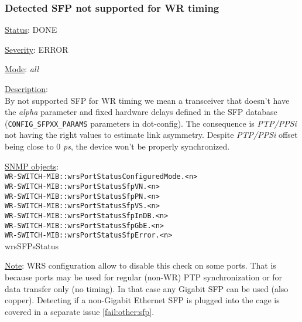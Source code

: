 \subsubsection{\bf Detected SFP not supported for WR timing}
		\label{fail:timing:wrong_sfp}
		\begin{packed_enum}
			\item [] \underline{Status}: DONE
			\item [] \underline{Severity}: ERROR
			\item [] \underline{Mode}: \emph{all}
			\item [] \underline{Description}:\\
				By not supported SFP for WR timing we mean a transceiver that doesn't
				have the \emph{alpha} parameter and fixed hardware delays defined in the
				SFP database (\texttt{CONFIG\_SFPXX\_PARAMS} parameters in dot-config). The consequence is
				\emph{PTP/PPSi} not having the right values to estimate link asymmetry.
				Despite \emph{PTP/PPSi} offset being close to 0 \emph{ps}, the device won't
				be properly synchronized.
			\item [] \underline{SNMP objects}:\\
				\texttt{WR-SWITCH-MIB::wrsPortStatusConfiguredMode.<n>}\\
				\texttt{WR-SWITCH-MIB::wrsPortStatusSfpVN.<n>}\\
				\texttt{WR-SWITCH-MIB::wrsPortStatusSfpPN.<n>}\\
				\texttt{WR-SWITCH-MIB::wrsPortStatusSfpVS.<n>}\\
				\texttt{WR-SWITCH-MIB::wrsPortStatusSfpInDB.<n>}\\
				\texttt{WR-SWITCH-MIB::wrsPortStatusSfpGbE.<n>}\\
				\texttt{WR-SWITCH-MIB::wrsPortStatusSfpError.<n>}\\
				wrsSFPsStatus
			\item [] \underline{Note}: WRS configuration allow to disable this check on some ports.
				That is because ports may be used for regular (non-WR) PTP
				synchronization or for data transfer only (no timing). In that case any
				Gigabit SFP can be used (also copper). Detecting if a non-Gigabit
				Ethernet SFP is plugged into the cage is covered in a separate issue
				\ref{fail:other:sfp}.
		\end{packed_enum}

